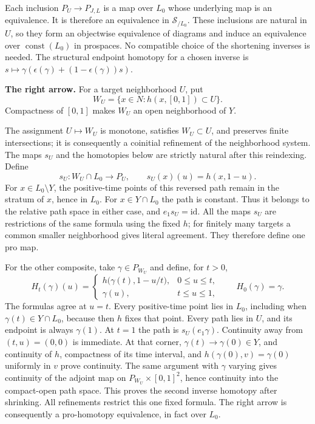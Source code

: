 \documentclass[11pt,a4paper]{article}
\theoremstyle{definition}
\begin{document}
Each inclusion $P_U\to P_{J,L}$ is a map over $L_0$ whose underlying
map is an equivalence. It is therefore an equivalence in
$\mathcal S_{/L_0}$. These inclusions are natural in $U$, so they form
an objectwise equivalence of diagrams and induce an equivalence over
$\operatorname{const}(L_0)$ in prospaces. No compatible choice of the
shortening inverses is needed. The structural endpoint homotopy for a
chosen inverse is
$s\mapsto\gamma(\epsilon(\gamma)+(1-\epsilon(\gamma))s)$.

\textbf{The right arrow.} For a target neighborhood \(U\), put
\[
 W_U=\{x\in N:h(x,[0,1])\subset U\}.
\]
Compactness of \([0,1]\) makes \(W_U\) an open neighborhood of \(Y\).

The assignment $U\mapsto W_U$ is monotone, satisfies $W_U\subset U$,
and preserves finite intersections; it is consequently a coinitial
refinement of the neighborhood system. The maps $s_U$ and the homotopies
below are strictly natural after this reindexing. Define
\[
 s_U:W_U\cap L_0\longrightarrow P_U,
 \qquad s_U(x)(u)=h(x,1-u).
\]
For \(x\in L_0\setminus Y\), the positive-time points of this reversed path remain in the stratum of \(x\), hence in \(L_0\). For \(x\in Y\cap L_0\) the path is constant. Thus it belongs to the relative path space in either case, and \(e_1s_U=\mathrm{id}\). All the maps \(s_U\) are restrictions of the same formula using the fixed \(h\); for finitely many targets a common smaller neighborhood gives literal agreement. They therefore define one pro map.

For the other composite, take \(\gamma\in P_{W_U}\) and define, for \(t>0\),
\[
 H_t(\gamma)(u)=
 \begin{cases}
 h\bigl(\gamma(t),1-u/t\bigr),&0\le u\le t,\\
 \gamma(u),&t\le u\le1,
 \end{cases}
 \qquad H_0(\gamma)=\gamma.
\]
The formulas agree at \(u=t\). Every positive-time point lies in \(L_0\), including when \(\gamma(t)\in Y\cap L_0\), because then \(h\) fixes that point. Every path lies in \(U\), and its endpoint is always \(\gamma(1)\). At \(t=1\) the path is \(s_U(e_1\gamma)\). Continuity away from \((t,u)=(0,0)\) is immediate. At that corner, \(\gamma(t)\to\gamma(0)\in Y\), and continuity of \(h\), compactness of its time interval, and \(h(\gamma(0),v)=\gamma(0)\) uniformly in \(v\) prove continuity. The same argument with \(\gamma\) varying gives continuity of the adjoint map on \(P_{W_U}\times[0,1]^2\), hence continuity into the compact-open path space. This proves the second inverse homotopy after shrinking. All refinements restrict this one fixed formula. The right arrow is consequently a pro-homotopy equivalence, in fact over \(L_0\).
\end{document}
